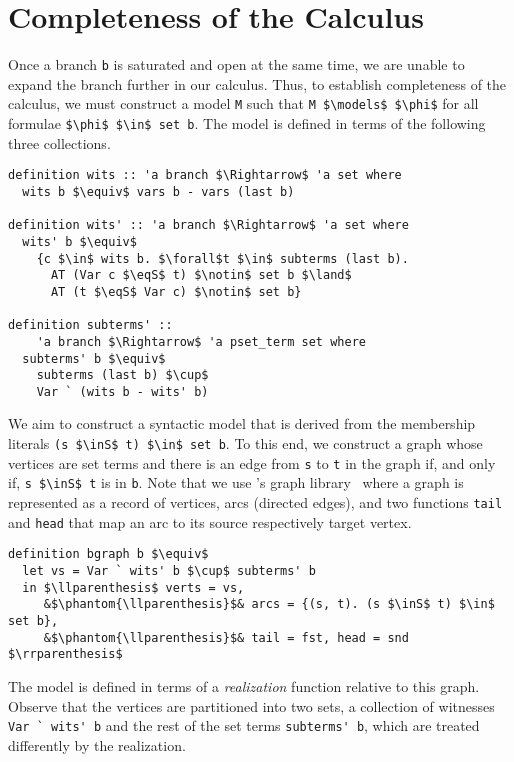 \documentclass[sigplan,10pt,anonymous,review]{acmart}
\newcommand{\inS}{\in_\text{s}}
\newcommand{\eqS}{=_\text{s}}
\begin{document}
\section{Completeness of the Calculus}
Once a branch \lstinline!b! is saturated and open at the same time, we are unable to expand the branch further in our calculus.
Thus, to establish completeness of the calculus, we must construct a model \lstinline!M! such that \lstinline!M $\models$ $\phi$! for all formulae \lstinline!$\phi$ $\in$ set b!.
The model is defined in terms of the following three collections.
\begin{lstlisting}
definition wits :: 'a branch $\Rightarrow$ 'a set where
  wits b $\equiv$ vars b - vars (last b)

definition wits' :: 'a branch $\Rightarrow$ 'a set where
  wits' b $\equiv$
    {c $\in$ wits b. $\forall$t $\in$ subterms (last b).
      AT (Var c $\eqS$ t) $\notin$ set b $\land$
      AT (t $\eqS$ Var c) $\notin$ set b} 

definition subterms' ::
    'a branch $\Rightarrow$ 'a pset_term set where
  subterms' b $\equiv$
    subterms (last b) $\cup$ 
    Var ` (wits b - wits' b)
\end{lstlisting}
We aim to construct a syntactic model that is derived from the membership literals \lstinline!(s $\inS$ t) $\in$ set b!.
To this end, we construct a graph whose vertices are set terms and there is an edge from \lstinline!s! to \lstinline!t! in the graph if, and only if, \lstinline!s $\inS$ t! is in \lstinline!b!.
Note that we use \citeauthor{graph_theory_afp}'s graph library~\cite{graph_theory_afp} where a graph is represented as a record of vertices, arcs (directed edges), and two functions \lstinline!tail! and \lstinline!head! that map an arc to its source respectively target vertex.
\begin{lstlisting}
definition bgraph b $\equiv$
  let vs = Var ` wits' b $\cup$ subterms' b
  in $\llparenthesis$ verts = vs,
     &$\phantom{\llparenthesis}$& arcs = {(s, t). (s $\inS$ t) $\in$ set b},
     &$\phantom{\llparenthesis}$& tail = fst, head = snd $\rrparenthesis$
\end{lstlisting}
The model is defined in terms of a \textit{realization} function relative to this graph.
Observe that the vertices are partitioned into two sets, a collection of witnesses \lstinline!Var ` wits' b! and the rest of the set terms \lstinline!subterms' b!, which are treated differently by the realization.
\end{document}
